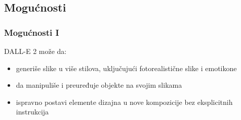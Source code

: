 \documentclass{beamer}
\begin{document}
\subsection{Mogućnosti}

\begin{frame}[fragile]\frametitle{Mogućnosti I}
	DALL-E 2 može da:
    \begin{itemize}
        \item generiše slike u više stilova, uključujući fotorealistične slike i emotikone
        \item da manipuliše i preuređuje objekte na svojim slikama
        \item ispravno postavi elemente dizajna u nove kompozicije bez eksplicitnih instrukcija
    \end{itemize}
    \newpage
\end{frame}
\end{document}

